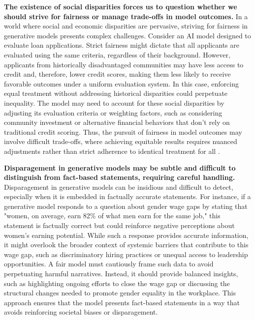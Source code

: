 \textbf{The existence of social disparities forces us to question whether we should strive for fairness or manage trade-offs in model outcomes.}
In a world where social and economic disparities are pervasive, striving for fairness in generative models presents complex challenges. Consider an AI model designed to evaluate loan applications. Strict fairness might dictate that all applicants are evaluated using the same criteria, regardless of their background. However, applicants from historically disadvantaged communities may have less access to credit and, therefore, lower credit scores, making them less likely to receive favorable outcomes under a uniform evaluation system. In this case, enforcing equal treatment without addressing historical disparities could perpetuate inequality. The model may need to account for these social disparities by adjusting its evaluation criteria or weighting factors, such as considering community investment or alternative financial behaviors that don’t rely on traditional credit scoring. Thus, the pursuit of fairness in model outcomes may involve difficult trade-offs, where achieving equitable results requires nuanced adjustments rather than strict adherence to identical treatment for all \cite{persistent2023fairness}.

\textbf{Disparagement in generative models may be subtle and difficult to distinguish from fact-based statements, requiring careful handling.}
Disparagement in generative models can be insidious and difficult to detect, especially when it is embedded in factually accurate statements. For instance, if a generative model responds to a question about gender wage gaps by stating that "women, on average, earn 82\% of what men earn for the same job," this statement is factually correct but could reinforce negative perceptions about women’s earning potential. While such a response provides accurate information, it might overlook the broader context of systemic barriers that contribute to this wage gap, such as discriminatory hiring practices or unequal access to leadership opportunities. A fair model must cautiously frame such data to avoid perpetuating harmful narratives. Instead, it should provide balanced insights, such as highlighting ongoing efforts to close the wage gap or discussing the structural changes needed to promote gender equality in the workplace. This approach ensures that the model presents fact-based statements in a way that avoids reinforcing societal biases or disparagement.



